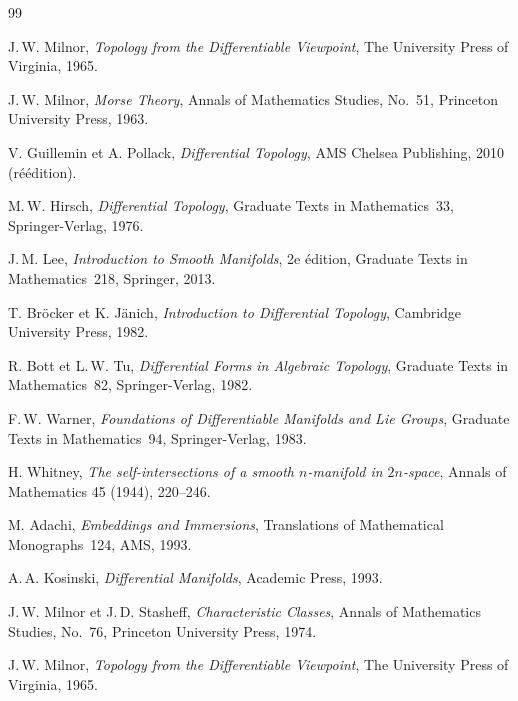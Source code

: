 \documentclass[12pt,a4paper,openany]{book}
\theoremstyle{definition}
\theoremstyle{plain}
\theoremstyle{remark}
\begin{document}
\begin{thebibliography}{99}

J.\,W. Milnor,
\emph{Topology from the Differentiable Viewpoint},
The University Press of Virginia, 1965.

J.\,W. Milnor,
\emph{Morse Theory},
Annals of Mathematics Studies, No.~51, Princeton University Press, 1963.

V. Guillemin et A. Pollack,
\emph{Differential Topology},
AMS Chelsea Publishing, 2010 (réédition).

M.\,W. Hirsch,
\emph{Differential Topology},
Graduate Texts in Mathematics~33, Springer-Verlag, 1976.

J.\,M. Lee,
\emph{Introduction to Smooth Manifolds},
2e édition, Graduate Texts in Mathematics~218, Springer, 2013.

T. Bröcker et K. Jänich,
\emph{Introduction to Differential Topology},
Cambridge University Press, 1982.

R. Bott et L.\,W. Tu,
\emph{Differential Forms in Algebraic Topology},
Graduate Texts in Mathematics~82, Springer-Verlag, 1982.

F.\,W. Warner,
\emph{Foundations of Differentiable Manifolds and Lie Groups},
Graduate Texts in Mathematics~94, Springer-Verlag, 1983.

H. Whitney,
\emph{The self-intersections of a smooth $n$-manifold in $2n$-space},
Annals of Mathematics 45 (1944), 220--246.

M. Adachi,
\emph{Embeddings and Immersions},
Translations of Mathematical Monographs~124, AMS, 1993.

A.\,A. Kosinski,
\emph{Differential Manifolds},
Academic Press, 1993.

J.\,W. Milnor et J.\,D. Stasheff,
\emph{Characteristic Classes},
Annals of Mathematics Studies, No.~76, Princeton University Press, 1974.

J.\,W. Milnor,
\emph{Topology from the Differentiable Viewpoint},
The University Press of Virginia, 1965.

\end{thebibliography}


\printindex
\end{document}
